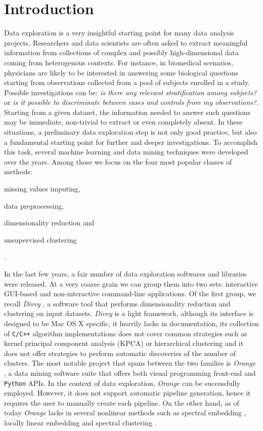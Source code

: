 \documentclass[twoside,11pt]{article}
\makeatletter
\newcommand{\py}{\texttt{Python}\@\xspace}
\makeatother
\begin{document}
\section{Introduction}\label{sec:intro}
Data exploration is a very insightful starting point for many data analysis projects. Researchers and data scientists are often asked to extract meaningful information from collections of complex and possibly high-dimensional data coming from heterogenous contexts. For instance, in biomedical scenarios, physicians are likely to be interested in answering some biological questions starting from observations collected from a pool of subjects enrolled in a study. Possible investigations can be: \emph{is there any relevant stratification among subjects?} or \emph{is it possible to discriminate between cases and controls from my observations?}. Starting from a given dataset, the information needed to answer such questions may be immediate, non-trivial to extract or even completely absent.
In these situations, a preliminary data exploration step is not only good practice, but also a fundamental starting point for further and deeper investigations. To accomplish this task, several machine learning and data mining techniques were developed over the years. Among those we focus on the four most popular classes of methods: \begin{enumerate*}[label=(\roman*)]
  \item missing values imputing,
  \item data preprocessing,
  \item dimensionality reduction and
  \item unsupervised clustering
\end{enumerate*}.

In the last few years, a fair number of data exploration softwares and libraries  were released. At a very coarse grain we can group them into two sets: interactive GUI-based and non-interactive command-line  applications. Of the first group, we recall \emph{Divvy} \citep{lewis2013divvy}, a software tool that performs dimensionality reduction and clustering on input datasets. \emph{Divvy} is a light framework, although its interface is designed to be Mac OS X specific, it heavily lacks in documentation, its collection of \texttt{C/C++} algorithm implementations does not cover common strategies such as kernel principal component analysis (KPCA) \citep{scholkopf1997kernel} or hierarchical clustering \citep{friedman2001elements} and it does not offer strategies to perform automatic discoveries of the number of clusters. The most notable project that spans between the two families is \emph{Orange} \citep{demvsar2013orange}, a data mining software suite that offers both visual programming front-end and \py APIs. In the context of data exploration, \emph{Orange} can be successfully employed. However, it does not support automatic pipeline generation, hence it requires the user to manually create each pipeline. On the other hand, as of today \emph{Orange} lacks in several nonlinear methods such as spectral embedding \citep{ng2002spectral}, locally linear embedding \citep{roweis2000nonlinear} and spectral clustering \citep{shi2000normalized}.
\end{document}
